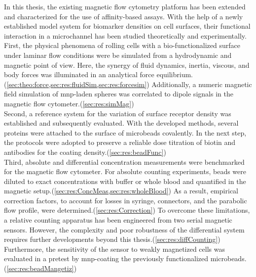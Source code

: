 In this thesis, the existing magnetic flow cytometry platform has been extended and characterized for the use of affinity-based assays. With the help of a newly established model system for biomarker densities on cell surfaces, their functional interaction in a microchannel has been studied theoretically and experimentally.\\
First, the physical phenomena of rolling cells with a bio-functionalized surface under laminar flow conditions were be simulated from a hydrodynamic and magnetic point of view. Here, the synergy of fluid dynamics, inertia, viscous, and body forces was illuminated in an analytical force equilibrium.(\cref{sec:theo:force,sec:res:fluidSim,sec:res:forcesim}) Additionally, a numeric magnetic field simulation of \gls{mnp}-laden spheres was correlated to dipole signals in the magnetic flow cytometer.(\cref{sec:res:simMag})\\
Second, a reference system for the variation of surface receptor density was established and subsequently evaluated. With the developed methods, several proteins were attached to the surface of microbeads covalently. In the next step, the protocols were adopted to preserve a reliable dose titration of biotin and antibodies for the coating density.(\cref{sec:res:beadFunc}) \\
Third, absolute and differential concentration measurements were benchmarked for the magnetic flow cytometer. For absolute counting experiments, beads were diluted to exact concentrations with buffer or whole blood and quantified in the magnetic setup.(\cref{sec:res:ConcMeas,sec:res:wholeBlood}) As a result, empirical correction factors, to account for losses in syringe, connectors, and the parabolic flow profile, were determined.(\cref{sec:res:Correction}) To overcome these limitations, a relative counting apparatus has been engineered from two serial magnetic sensors. However, the complexity and poor robustness of the differential system requires further developments beyond this thesis.(\cref{sec:res:diffCounting}) Furthermore, the sensitivity of the sensor to weakly magnetized cells was evaluated in a pretest by \gls{mnp}-coating the previously functionalized microbeads.(\cref{sec:res:beadMangetiz}) \\
